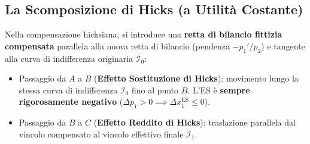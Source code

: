 \subsection{La Scomposizione di Hicks (a Utilità Costante)}
Nella compensazione hicksiana, si introduce una \textbf{retta di bilancio fittizia compensata} parallela alla nuova retta di bilancio (pendenza $-p_1'/p_2$) e tangente alla curva di indifferenza originaria $\mathcal{I}_0$:
\begin{itemize}
    \item Passaggio da $A$ a $B$ (\textbf{Effetto Sostituzione di Hicks}): movimento lungo la stessa curva di indifferenza $\mathcal{I}_0$ fino al punto $B$. L'$\text{ES}$ è \textbf{sempre rigorosamente negativo} ($\Delta p_1 > 0 \implies \Delta x_1^{\text{ES}} \le 0$).
    \item Passaggio da $B$ a $C$ (\textbf{Effetto Reddito di Hicks}): traslazione parallela dal vincolo compensato al vincolo effettivo finale $\mathcal{I}_1$.
\end{itemize}

